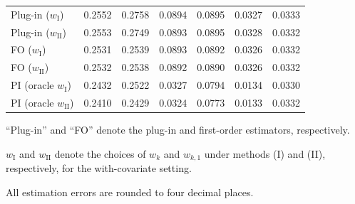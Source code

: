 \documentclass[11pt]{article}
\begin{document}
\begin{table}[htp!]
\begin{threeparttable}
\begin{tabular}{lcccccc}
Plug-in ($w_{\mathrm{I}}$)         & 0.2552 & 0.2758 & 0.0894 & 0.0895 & 0.0327 & 0.0333 \\
Plug-in ($w_{\mathrm{II}}$)        & 0.2553 & 0.2749 & 0.0893 & 0.0895 & 0.0328 & 0.0332 \\
FO ($w_{\mathrm{I}}$)              & 0.2531 & 0.2539 & 0.0893 & 0.0892 & 0.0326 & 0.0332 \\
FO ($w_{\mathrm{II}}$)             & 0.2532 & 0.2538 & 0.0892 & 0.0890 & 0.0326 & 0.0332 \\
PI (oracle $w_{\mathrm{I}}$)       & 0.2432 & 0.2522 & 0.0327 & 0.0794 & 0.0134 & 0.0330 \\
PI (oracle $w_{\mathrm{II}}$)      & 0.2410 & 0.2429 & 0.0324 & 0.0773 & 0.0133 & 0.0332 \\
\bottomrule
\end{tabular}
\begin{tablenotes}
\footnotesize
\item[a] ``Plug-in'' and ``FO'' denote the plug-in and first-order estimators, respectively.
\item[b] $w_{\mathrm{I}}$ and $w_{\mathrm{II}}$ denote the choices of $w_k$ and $w_{k,1}$ under methods (I) and (II), respectively, for the with-covariate setting.
\item[c] All estimation errors are rounded to four decimal places.
\end{tablenotes}
\end{threeparttable}
\end{table}
\end{document}
